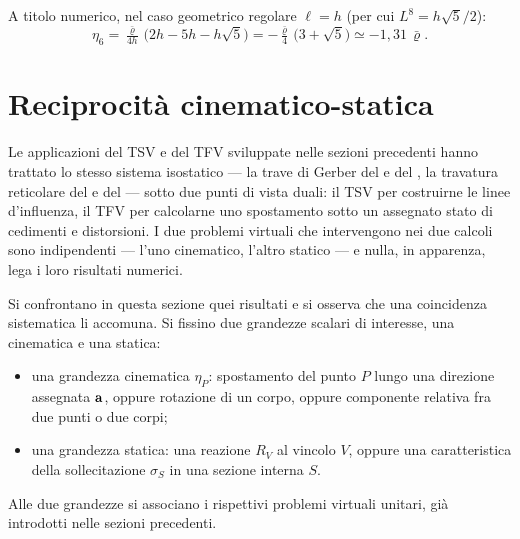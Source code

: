 \begin{esempio}
\begin{svolgimento}
		
		A titolo numerico, nel caso geometrico regolare $\ell = h$ (per
		cui $L^{8} = h\sqrt{5}/2$):
		\begin{equation*}
			\eta_6 = \tfrac{\bar\varrho}{4h}\,
			\bigl(2h - 5h - h\sqrt{5}\bigr)
			= -\tfrac{\bar\varrho}{4}\,\bigl(3 + \sqrt{5}\bigr)
			\simeq -1{,}31\,\bar\varrho.
		\end{equation*}
	\end{svolgimento}
\end{esempio}


\section{Reciprocità cinematico-statica}
\label{sec:reciprocita}

Le applicazioni del TSV e del TFV sviluppate nelle sezioni 
precedenti hanno trattato lo stesso sistema isostatico --- la 
trave di Gerber del  e del 
, la travatura reticolare del 
 e del  
--- sotto due punti di vista duali: il TSV per costruirne le linee 
d'influenza, il TFV per calcolarne uno spostamento sotto un 
assegnato stato di cedimenti e distorsioni. I due problemi virtuali 
che intervengono nei due calcoli sono indipendenti --- l'uno 
cinematico, l'altro statico --- e nulla, in apparenza, lega i 
loro risultati numerici.

Si confrontano in questa sezione quei risultati e si osserva che 
una coincidenza sistematica li accomuna. Si fissino due grandezze 
scalari di interesse, una cinematica e una statica:
\begin{itemize}[noitemsep,topsep=2pt]
	\item una grandezza cinematica $\eta_P$: spostamento del punto 
	$P$ lungo una direzione assegnata $\mathbf{a}$, oppure rotazione di 
	un corpo, oppure componente relativa fra due punti o due corpi;
	\item una grandezza statica: una reazione $R_V$ al vincolo $V$, 
	oppure una caratteristica della sollecitazione $\sigma_S$ in 
	una sezione interna $S$.
\end{itemize}
Alle due grandezze si associano i rispettivi problemi virtuali 
unitari, già introdotti nelle sezioni precedenti.

